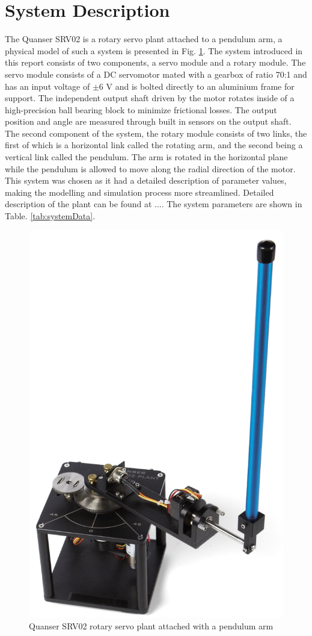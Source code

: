 \documentclass[superscriptaddress,floatfix,reprint,amssymb, amsmath,aps, pre]{revtex4-1}
\begin{document}
{    \section{System Description}{
        The Quanser SRV02 is a rotary servo plant attached to a pendulum arm, a physical model of such a system is presented in Fig. \ref{fig:rotarySystem}. The system introduced in this report consists of two components, a servo module and a rotary module.  The servo module consists of a DC servomotor mated with a gearbox of ratio 70:1 and has an input voltage of \(\pm 6\) V and is bolted directly to an aluminium frame for support. The independent output shaft driven by the motor rotates inside of a high-precision ball bearing block to minimize frictional losses. The output position and angle are measured through built in sensors on the output shaft. The second component of the system, the rotary module consists of two links, the first of which is a horizontal link called the rotating arm, and the second being a vertical link called the pendulum. The arm is rotated in the horizontal plane while the pendulum is allowed to move along the radial direction of the motor. This system was chosen as it had a detailed description of parameter values, making the modelling and simulation process more streamlined. Detailed description of the plant can be found at .... The system parameters are shown in Table. \ref{tab:systemData}.
        \begin{figure}[h!]
            \includegraphics[width = 0.5\linewidth]{systemPic.png}
            \caption{Quanser SRV02 rotary servo plant attached with a pendulum arm}
            \label{fig:rotarySystem}

\end{figure}}}
\end{document}
